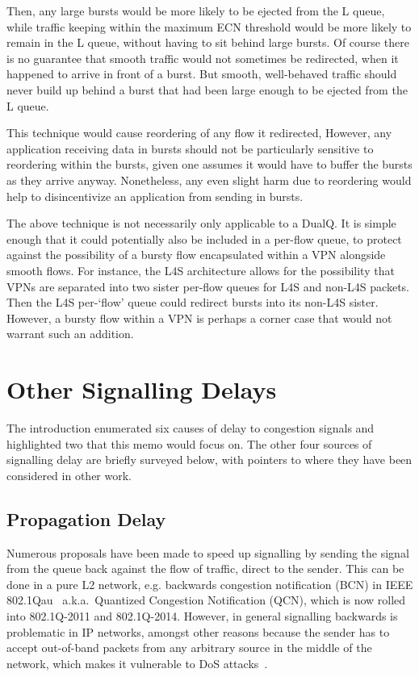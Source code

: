 Then, any large bursts would be more likely to be ejected from the L queue, while traffic keeping within the maximum ECN threshold would be more likely to remain in the L queue, without having to sit behind large bursts. Of course there is no guarantee that smooth traffic would not sometimes be redirected, when it happened to arrive in front of a burst. But smooth, well-behaved traffic should never build up behind a burst that had been large enough to be ejected from the L queue.

This technique would cause reordering of any flow it redirected, However, any application receiving data in bursts should not be particularly sensitive to reordering within the bursts, given one assumes it would have to buffer the bursts as they arrive anyway. Nonetheless, any even slight harm due to reordering would help to disincentivize an application from sending in bursts.

The above technique is not necessarily only applicable to a DualQ. It is simple enough that it could potentially also be included in a per-flow queue, to protect against the possibility of a bursty flow encapsulated within a VPN alongside smooth flows. For instance, the L4S architecture allows for the possibility that VPNs are separated into two sister per-flow queues for L4S and non-L4S packets. Then the L4S per-`flow' queue could redirect bursts into its non-L4S sister. However, a bursty flow within a VPN is perhaps a corner case that would not warrant such an addition.

\section{Other Signalling Delays}\label{sec:other_delays}

The introduction enumerated six causes of delay to congestion signals and highlighted two that this memo would focus on. The other four sources of signalling delay are briefly surveyed below, with pointers to where they have been considered in other work.

\subsection{Propagation Delay} Numerous proposals have been made to speed up signalling by sending the signal from the queue back against the flow of traffic, direct to the sender. This can be done in a pure L2 network, e.g. backwards congestion notification (BCN) in IEEE 802.1Qau~\cite{IEEE802.1Qau:Ethernet_QCN} a.k.a.\ Quantized Congestion Notification (QCN), which is now rolled into 802.1Q-2011 and 802.1Q-2014. However, in general signalling backwards is problematic in IP networks, amongst other reasons because the sender has to accept out-of-band packets from any arbitrary source in the middle of the network, which makes it vulnerable to DoS attacks~\cite{IETF_RFC6633:ICMP_SQ_Depr}. 

